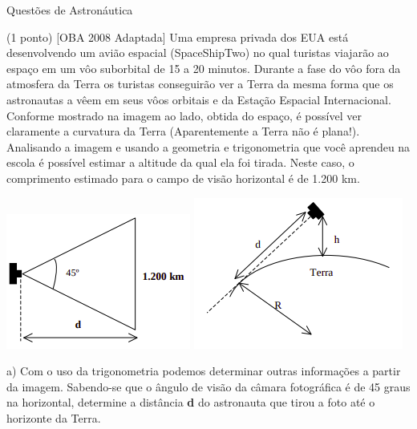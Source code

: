 \documentclass{../lista}
\begin{document}
	\begin{secao}{Questões de Astronáutica}
		\begin{questao}{(1 ponto) [OBA 2008 Adaptada]}
			Uma empresa privada dos EUA está desenvolvendo um avião espacial (SpaceShipTwo) no qual turistas viajarão ao espaço em um vôo suborbital de 15 a 20 minutos. Durante a fase do vôo fora da atmosfera da Terra os turistas conseguirão ver a Terra da mesma forma que os astronautas a vêem em seus vôos orbitais e da Estação Espacial Internacional. Conforme mostrado na imagem ao lado, obtida do espaço, é possível ver claramente a curvatura da Terra (Aparentemente a Terra não é plana!). Analisando a imagem e usando a geometria e trigonometria que você aprendeu na escola é possível estimar a altitude da qual ela foi tirada. Neste caso, o comprimento estimado para o campo de visão horizontal é de 1.200 km.
			
			\begin{center}
				\includegraphics[height=.4\linewidth]{./img/8-1.png} \includegraphics[height=.4\linewidth]{./img/8-2.png}
			\end{center}
			
			a) Com o uso da trigonometria podemos determinar outras informações a partir da imagem. Sabendo-se que o ângulo de visão da câmara fotográfica é de 45 graus na horizontal, determine a distância \textbf{d} do astronauta que tirou a foto até o horizonte da Terra. \\
			

\end{questao}
\end{secao}
\end{document}
